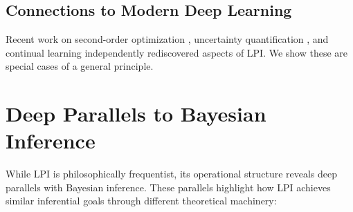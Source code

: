 \documentclass[11pt]{article}
\begin{document}
\subsection{Connections to Modern Deep Learning}

Recent work on second-order optimization \cite{botev2017practical}, uncertainty quantification \cite{zhang2018noisy}, and continual learning \cite{kirkpatrick2017overcoming} independently rediscovered aspects of LPI. We show these are special cases of a general principle.

\section{Deep Parallels to Bayesian Inference}

While LPI is philosophically frequentist, its operational structure reveals deep parallels with Bayesian inference. These parallels highlight how LPI achieves similar inferential goals through different theoretical machinery:
\end{document}
